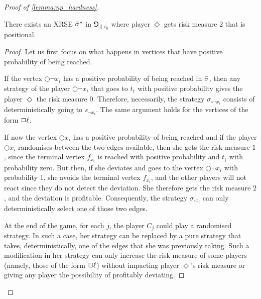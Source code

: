 \begin{proof}[Proof of \cref{lemma:np_hardness}]
\begin{claim}
    There exists an XRSE ${\bar{\sigma}}^\star$ in $\Game_{\|v_0}$ where player $\Diamond$ gets risk measure $2$ that is positional.
\end{claim}

\begin{proof}
    Let us first focus on what happens in vertices that have positive probability of being reached.

    If the vertex $\Circle\neg x_i$ has a positive probability of being reached in ${\bar{\sigma}}$, then any strategy of the player $\Circle \neg x_i$ that goes to $t_\dag$ with positive probability gives the player $\Diamond$ the risk measure $0$.
    Therefore, necessarily, the strategy $\sigma_{\circ \neg x_i}$ consists of deterministically going to $s_{\neg x_i}$.
    The same argument holds for the vertices of the form $\Square \l$.
    
    If now the vertex $\Circle x_i$ has a positive probability of being reached and if the player $\Circle x_i$ randomises between the two edges available, then she gets the risk measure $1$, since the terminal vertex $f_{x_i}$ is reached with positive probability and $t_\dag$ with probability zero.
    But then, if she deviates and goes to the vertex $\Circle \neg x_i$ with probability $1$, she avoids the terminal vertex $f_{x_i}$, and the other players will not react since they do not detect the deviation.
    She therefore gets the risk measure $2$, and the deviation is profitable.
    Consequently, the strategy $\sigma_{\circ x_i}$ can only  deterministically select one of those two edges.

    At the end of the game, for each $j$, the player $C_j$ could play a randomised strategy. In such a case, her strategy can be replaced by a pure strategy that takes, deterministically, one of the edges that she was previously taking.
    Such a modification in her strategy can only increase the risk measure of some players (namely, those of the form $\Square \l$) without impacting player $\Diamond$'s risk measure or giving any player the possibility of profitably deviating.


\end{proof}
\end{proof}
